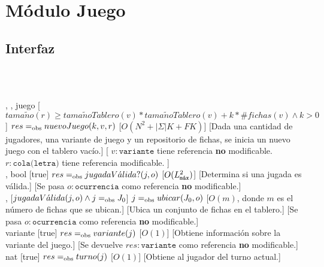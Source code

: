 \section{Módulo Juego}
\begin{interfaz}{\subsection{Interfaz}}
  \\\\
  \par\noindent
  \begin{operaciones}
    {, , }{juego}
    [$tama\tilde{n}o(r)\geq tama\tilde{n}oTablero(v)*tama\tilde{n}oTablero(v)+k*\#fichas(v)\land k>0$]
    {$res \igobs nuevoJuego(k,v,r)$}
    [$O(N^{2}+|\Sigma|K+FK)$]
    [Dada una cantidad de jugadores, una variante de juego y un repositorio de fichas, se inicia un nuevo juego con el tablero vacío.]
    [
    $v:\texttt{variante}$ tiene referencia \textbf{no} modificable.\\
    \-\hspace{5em}$r:\texttt{cola(letra)}$ tiene referencia modificable.
    ]\\

    \noindent{}
    {, }{bool}
    [true]
    {$res\igobs jugadaV\acute{a}lida?(j,o)$}
    [$O(\Lmax^{2})$]
    [Determina si una jugada es válida.]
    [Se pasa $o:\texttt{ocurrencia}$ como referencia \textbf{no} modificable.]\\

    \noindent{}
    {, }{}
    [$jugadaV\acute{a}lida(j,o) \land j\igobs J_{0} $]
    {$j\igobs ubicar(J_{0},o)$}
    [$O(m)$, donde $m$ es el número de fichas que se ubican.]
    [Ubica un conjunto de fichas en el tablero.]
    [Se pasa $o:\texttt{ocurrencia}$ como referencia \textbf{no} modificable.]\\

    \noindent{}
    {}{variante}
    [true]
    {$res\igobs variante(j)$}
    [$O(1)$]
    [Obtiene información sobre la variante del juego.]
    [Se devuelve $res:\texttt{variante}$ como referencia \textbf{no} modificable.]\\

    \noindent{}
    {}{nat}
    [true]
    {$res\igobs turno(j)$}
    [$O(1)$]
    [Obtiene al jugador del turno actual.]\\


\end{operaciones}
\end{interfaz}
